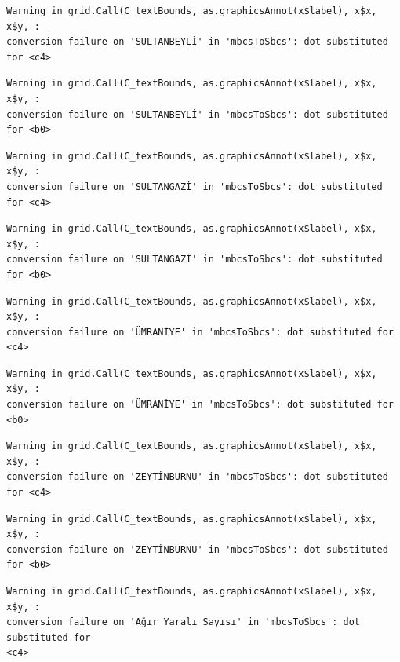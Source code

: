 \documentclass[
  11pt,
  a4paper,
  DIV=11,
  numbers=noendperiod]{scrartcl}
\begin{document}
\begin{verbatim}
Warning in grid.Call(C_textBounds, as.graphicsAnnot(x$label), x$x, x$y, :
conversion failure on 'SULTANBEYLİ' in 'mbcsToSbcs': dot substituted for <c4>
\end{verbatim}

\begin{verbatim}
Warning in grid.Call(C_textBounds, as.graphicsAnnot(x$label), x$x, x$y, :
conversion failure on 'SULTANBEYLİ' in 'mbcsToSbcs': dot substituted for <b0>
\end{verbatim}

\begin{verbatim}
Warning in grid.Call(C_textBounds, as.graphicsAnnot(x$label), x$x, x$y, :
conversion failure on 'SULTANGAZİ' in 'mbcsToSbcs': dot substituted for <c4>
\end{verbatim}

\begin{verbatim}
Warning in grid.Call(C_textBounds, as.graphicsAnnot(x$label), x$x, x$y, :
conversion failure on 'SULTANGAZİ' in 'mbcsToSbcs': dot substituted for <b0>
\end{verbatim}

\begin{verbatim}
Warning in grid.Call(C_textBounds, as.graphicsAnnot(x$label), x$x, x$y, :
conversion failure on 'ÜMRANİYE' in 'mbcsToSbcs': dot substituted for <c4>
\end{verbatim}

\begin{verbatim}
Warning in grid.Call(C_textBounds, as.graphicsAnnot(x$label), x$x, x$y, :
conversion failure on 'ÜMRANİYE' in 'mbcsToSbcs': dot substituted for <b0>
\end{verbatim}

\begin{verbatim}
Warning in grid.Call(C_textBounds, as.graphicsAnnot(x$label), x$x, x$y, :
conversion failure on 'ZEYTİNBURNU' in 'mbcsToSbcs': dot substituted for <c4>
\end{verbatim}

\begin{verbatim}
Warning in grid.Call(C_textBounds, as.graphicsAnnot(x$label), x$x, x$y, :
conversion failure on 'ZEYTİNBURNU' in 'mbcsToSbcs': dot substituted for <b0>
\end{verbatim}

\begin{verbatim}
Warning in grid.Call(C_textBounds, as.graphicsAnnot(x$label), x$x, x$y, :
conversion failure on 'Ağır Yaralı Sayısı' in 'mbcsToSbcs': dot substituted for
<c4>
\end{verbatim}
\end{document}
